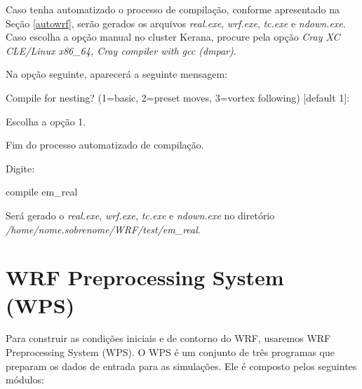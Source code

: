 \noindent Caso tenha automatizado o processo de compilação, conforme apresentado na Seção \textcolor{bleu_cite}{\ref{autowrf}}, serão gerados os arquivos \textit{real.exe}, \textit{wrf.exe}, \textit{tc.exe} e \textit{ndown.exe}. Caso escolha a opção manual no cluster Kerana, procure pela opção \textit{Cray XC CLE/Linux x86\_64, Cray compiler with gcc  (dmpar)}.
\bigskip

\noindent Na opção seguinte, aparecerá a seguinte mensagem:
\bigskip

\begin{bashcode}
Compile for nesting? (1=basic, 2=preset moves, 3=vortex following) [default 1]:
\end{bashcode}
\bigskip

\noindent Escolha a opção 1.
\bigskip

\begin{tcolorbox}[enhanced,
  grow to left by=0cm,%
  grow to right by=0cm,%
  enlarge top by=0cm,%
  enlarge bottom by=0cm,%
  tcbox raise base,
  boxrule=1.0pt,
  left=18mm,
  colframe=red!50!black,coltext=red!25!black,colback=red!10!white,
  overlay={\begin{tcbclipinterior}\fill[red!75!blue!50!white] (frame.south west)
    rectangle node[text=white,font=\sffamily\bfseries\footnotesize,rotate=0] {ATENÇÃO} ([xshift=18mm]frame.north west);\end{tcbclipinterior}}]
Fim do processo automatizado de compilação.
\end{tcolorbox}
\bigskip

\noindent Digite:
\bigskip

\begin{bashcode}
compile em_real
\end{bashcode}
\bigskip

\noindent Será gerado o \textit{real.exe}, \textit{wrf.exe}, \textit{tc.exe} e \textit{ndown.exe} no diretório \textit{/home/nome.sobrenome/WRF/test/em\_real}.
\bigskip

\section{WRF Preprocessing System (WPS)}\label{wpssecao}
\bigskip

\noindent Para construir as condições iniciais e de contorno do WRF, usaremos WRF Preprocessing System (WPS). O WPS é um conjunto de três programas que preparam os dados de entrada para as simulações. Ele é composto pelos seguintes módulos:
\bigskip

